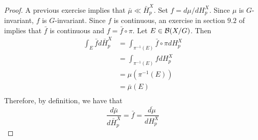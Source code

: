 \documentclass{book}
\begin{document}
	\begin{proof}
	A previous exercise implies that $\bar{\mu} \ll \bar{H}_p^X$. Set $f = d \mu /d H_p^X$. Since $\mu$ is $G$-invariant, $f$ is $G$-invariant. Since $f$ is continuous, an exercise in section $9.2$ of \cite{analysis} implies that $\bar{f}$ is continuous and $f = \bar{f} \circ \pi$. Let $E \in \mathcal{B}(X/G)$. Then 
	\begin{align*}
	\int_E \bar{f} d \bar{H}_p^X 
	&= \int_{\pi^{-1}(E)} \bar{f} \circ \pi dH_p^X \\
	&= \int_{\pi^{-1}(E)} f dH_p^X \\
	&= \mu(\pi^{-1}(E)) \\
	&= \bar{\mu}(E) \\
\end{align*}	 
	Therefore, by definition, we have that
	\begin{equation*}
	\frac{d \bar{\mu}}{d \bar{H}_p^X} = \bar{f} = \overline{\frac{d \mu}{d H_p^X}}
	\end{equation*}
	\end{proof}
	
	
	
	
	
	
	
	
	
	
	
	
	
	
	
	
	
	
	
	
	
	
	
	
	
	

	
	
	
	
	
	
	
	
	
	
	
	
	
	
	
	
	
	
	
	
	
	
\end{document}
